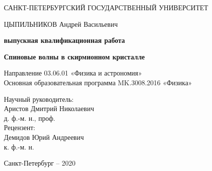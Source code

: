 \begin{titlepage}
\newpage

\begin{center}
САНКТ-ПЕТЕРБУРГСКИЙ ГОСУДАРСТВЕННЫЙ УНИВЕРСИТЕТ\\
\vspace{1cm}

\end{center}


\vspace{0.5cm}
\begin{center}
ЦЫПИЛЬНИКОВ Андрей Васильевич
\end{center}

\vspace{1cm}
\begin{center}
    \textbf{выпускная квалификационная работа}
\end{center}{}
\vspace{1cm}

\begin{center}
\Large{\bf Спиновые волны в скирмионном кристалле}
\end{center}
\vspace{1cm}
\begin{center}
Направление 03.06.01 «Физика и астрономия» \\
Основная образовательная программа MK.3008.2016 «Физика»
\end{center}
\vspace{1cm}


\begin{flushleft}
 Научный руководитель:\\
 Аристов Дмитрий Николаевич\\
 д. ф.-м. н., проф.\\
 Рецензент:\\
 Демидов Юрий Андреевич\\
 к. ф.-м. н.\\
\vspace{1.5em}
\end{flushleft}

\vspace{\fill}

\begin{center}
Санкт-Петербург -- 2020
\end{center}
\end{titlepage}
